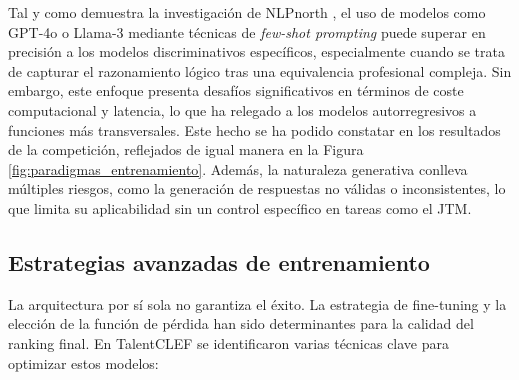 Tal y como demuestra la investigación de NLPnorth \cite{zhang2025nlpnorth}, el uso de modelos como GPT-4o o Llama-3 mediante técnicas de \textit{few-shot prompting} puede superar en precisión a los modelos discriminativos específicos, especialmente cuando se trata de capturar el razonamiento lógico tras una equivalencia profesional compleja. Sin embargo, este enfoque presenta desafíos significativos en términos de coste computacional y latencia, lo que ha relegado a los modelos autorregresivos a funciones más transversales. Este hecho se ha podido constatar en los resultados de la competición, reflejados de igual manera en la Figura \ref{fig:paradigmas_entrenamiento}. Además, la naturaleza generativa conlleva múltiples riesgos, como la generación de respuestas no válidas o inconsistentes, lo que limita su aplicabilidad sin un control específico en tareas como el \gls{JTM}.

\subsection{Estrategias avanzadas de entrenamiento}

\noindent La arquitectura por sí sola no garantiza el éxito. La estrategia de fine-tuning y la elección de la función de pérdida han sido determinantes para la calidad del ranking final. En TalentCLEF se identificaron varias técnicas clave para optimizar estos modelos:

